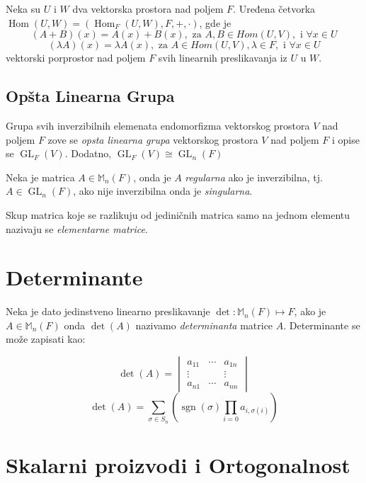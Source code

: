 \documentclass[12p,a4paper]{article}
\DeclareMathOperator{\Hom}{Hom}
\DeclareMathOperator{\GL}{GL}
\DeclareMathOperator{\sgn}{sgn}
\begin{document}
\begin{multicols}{2}
    Neka su $U$ i $W$ dva vektorska prostora nad poljem $F$. Uređena četvorka 
    $\Hom(U, W) = (\Hom_F(U, W), F, +, \cdot)$, gde je
    \[ (A + B) (x) = A(x) + B(x), \text{ za } A, B \in Hom(U, V), 
    \text { i } \forall x \in U\]
    \[ (\lambda A) (x) = \lambda A(x), \text{ za } A \in Hom(U, V), 
    \lambda \in F, \text { i } \forall x \in U\]
    vektorski porprostor nad poljem $F$ svih linearnih preslikavanja 
    iz $U$ u $W$.

\subsection{Opšta Linearna Grupa}

    Grupa svih inverzibilnih elemenata endomorfizma vektorskog prostora $V$ 
    nad poljem $F$ zove se \textit{opsta linearna grupa} vektorskog 
    prostora $V$ nad poljem $F$ i opise se $\GL_F(V)$. 
    Dodatno, $\GL_F(V) \cong \GL_n(F)$

    Neka je matrica $A \in \mathbb{M}_n (F)$, onda je $A$ \textit{regularna} 
    ako je inverzibilna, tj.\ $A \in \GL_n(F)$, ako nije inverzibilna onda 
    je \textit{singularna}.

    Skup matrica koje se razlikuju od jediničnih matrica samo na 
    jednom elementu nazivaju se \textit{elementarne matrice}.

\section{Determinante}

    Neka je dato jedinstveno linearno preslikavanje 
    $\det : \mathbb{M}_n (F) \mapsto F$, ako je $A \in \mathbb{M}_n(F)$ onda 
    $\det(A)$ nazivamo \textit{determinanta} matrice $A$. Determinante se 
    može zapisati kao:

    \[
        \det(A) = 
        \begin{vmatrix}
            a_{11} & \cdots & a_{1n} \\
            \vdots & &        \vdots \\
            a_{n1} & \cdots & a_{nn} 
        \end{vmatrix}
    \]
    \[ 
        \det(A) = \sum_{\sigma \in S_n} 
        \left( 
        \sgn(\sigma) \prod_{i=0} a_{i,\sigma(i)} 
        \right) 
    \]

\section{Skalarni proizvodi i Ortogonalnost}


\end{multicols}
\end{document}

